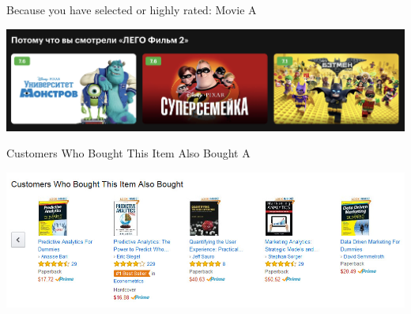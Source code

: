 \documentclass[11pt,aspectratio=169,handout]{beamer}
\begin{document}
\begin{frame}

\begin{tcolorbox}[colback=info!5,colframe=info!80,title=Case-based]
Because you have selected or highly rated: Movie A
\end{tcolorbox}

\vfill

\begin{center}
\includegraphics[scale=0.3]{images/netflix.png}
\end{center}

\end{frame}

\begin{frame}

\begin{tcolorbox}[colback=info!5,colframe=info!80,title=Collaborative]
Customers Who Bought This Item Also Bought A
\end{tcolorbox}

\vfill

\begin{center}
\includegraphics[scale=0.3]{images/amazon.jpeg}
\end{center}

\end{frame}
\end{document}
